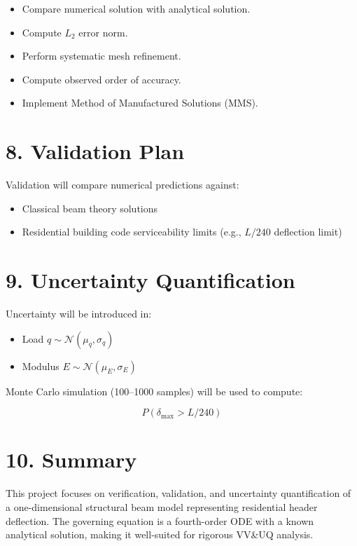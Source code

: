 \documentclass[12pt]{article}
\begin{document}
\begin{itemize}
\item Compare numerical solution with analytical solution.
\item Compute $L_2$ error norm.
\item Perform systematic mesh refinement.
\item Compute observed order of accuracy.
\item Implement Method of Manufactured Solutions (MMS).
\end{itemize}

\section*{8. Validation Plan}

Validation will compare numerical predictions against:

\begin{itemize}
\item Classical beam theory solutions
\item Residential building code serviceability limits (e.g., $L/240$ deflection limit)
\end{itemize}

\section*{9. Uncertainty Quantification}

Uncertainty will be introduced in:

\begin{itemize}
\item Load $q \sim \mathcal{N}(\mu_q, \sigma_q)$
\item Modulus $E \sim \mathcal{N}(\mu_E, \sigma_E)$
\end{itemize}

Monte Carlo simulation (100--1000 samples) will be used to compute:

\begin{equation}
P(\delta_{\max} > L/240)
\end{equation}

\section*{10. Summary}

This project focuses on verification, validation, and uncertainty quantification of a one-dimensional structural beam model representing residential header deflection. The governing equation is a fourth-order ODE with a known analytical solution, making it well-suited for rigorous VV\&UQ analysis.
\end{document}
